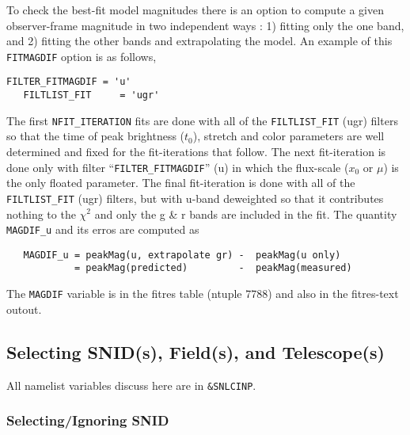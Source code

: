 \documentclass[12pt]{article}
\begin{document}
To check the best-fit model magnitudes there is an 
option to compute a given observer-frame magnitude 
in two independent ways : 1) fitting only the one band,
and 2) fitting the other bands and extrapolating the
model.  An example of this {\tt FITMAGDIF} option is
as follows,
%
\begin{Verbatim}[frame=single]
   FILTER_FITMAGDIF = 'u'
   FILTLIST_FIT     = 'ugr'
\end{Verbatim}
%
The first {\tt NFIT\_ITERATION} fits are done with
all of the {\tt FILTLIST\_FIT} (ugr) filters so that
the time of peak brightness ($t_0$), stretch and color
parameters are well determined and fixed for the fit-iterations
that follow.  The next fit-iteration is done only
with filter ``{\tt FILTER\_FITMAGDIF}'' (u) in which
the flux-scale ($x_0$ or $\mu$) is the only floated parameter.
The final fit-iteration is done with all of the
{\tt FILTLIST\_FIT} (ugr) filters, but with u-band 
deweighted so that it contributes nothing to the $\chi^2$
and only the g \& r bands are included in the fit.
The quantity {\tt MAGDIF\_u} and its erros are computed as
\begin{verbatim}
   MAGDIF_u = peakMag(u, extrapolate gr) -  peakMag(u only) 
            = peakMag(predicted)         -  peakMag(measured)
\end{verbatim}
The {\tt MAGDIF} variable is in the fitres table (ntuple 7788)
and also in the fitres-text outout.

   \subsection{Selecting SNID(s), Field(s), and Telescope(s) }
   \label{subsec:select}

All namelist variables discuss here are in {\tt \&SNLCINP}.


\subsubsection{Selecting/Ignoring SNID}
\label{sss:select_SNID}
\end{document}
